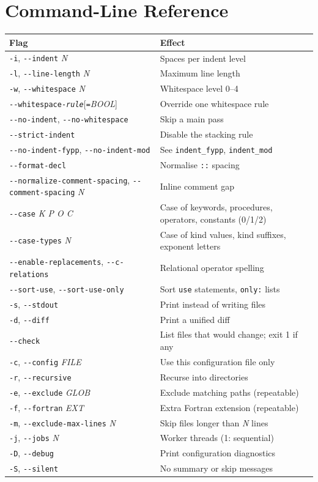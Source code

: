 \documentclass[11pt,a4paper,openany]{book}
\newcommand{\code}[1]{\texttt{\small #1}}
\newcommand{\flag}[1]{\texttt{\small -{}-#1}}
\begin{document}
\chapter{Command-Line Reference}\label{app:cli}

\begin{center}
\small
\begin{tabularx}{\linewidth}{@{}l X@{}}
\toprule
Flag & Effect\\
\midrule
\code{-i}, \flag{indent} \textit{N} & Spaces per indent level\\
\code{-l}, \flag{line-length} \textit{N} & Maximum line length\\
\code{-w}, \flag{whitespace} \textit{N} & Whitespace level 0--4\\
\flag{whitespace-\textit{rule}}[\code{=}\textit{BOOL}] & Override one whitespace rule\\
\flag{no-indent}, \flag{no-whitespace} & Skip a main pass\\
\flag{strict-indent} & Disable the stacking rule\\
\flag{no-indent-fypp}, \flag{no-indent-mod} & See \code{indent\_fypp}, \code{indent\_mod}\\
\flag{format-decl} & Normalise \code{::} spacing\\
\flag{normalize-comment-spacing}, \flag{comment-spacing} \textit{N} & Inline comment gap\\
\flag{case} \textit{K P O C} & Case of keywords, procedures, operators, constants (0/1/2)\\
\flag{case-types} \textit{N} & Case of kind values, kind suffixes, exponent letters\\
\flag{enable-replacements}, \flag{c-relations} & Relational operator spelling\\
\flag{sort-use}, \flag{sort-use-only} & Sort \code{use} statements, \code{only:} lists\\
\code{-s}, \flag{stdout} & Print instead of writing files\\
\code{-d}, \flag{diff} & Print a unified diff\\
\flag{check} & List files that would change; exit 1 if any\\
\code{-c}, \flag{config} \textit{FILE} & Use this configuration file only\\
\code{-r}, \flag{recursive} & Recurse into directories\\
\code{-e}, \flag{exclude} \textit{GLOB} & Exclude matching paths (repeatable)\\
\code{-f}, \flag{fortran} \textit{EXT} & Extra Fortran extension (repeatable)\\
\code{-m}, \flag{exclude-max-lines} \textit{N} & Skip files longer than \textit{N} lines\\
\code{-j}, \flag{jobs} \textit{N} & Worker threads (1: sequential)\\
\code{-D}, \flag{debug} & Print configuration diagnostics\\
\code{-S}, \flag{silent} & No summary or skip messages\\
\bottomrule
\end{tabularx}
\end{center}
\end{document}
